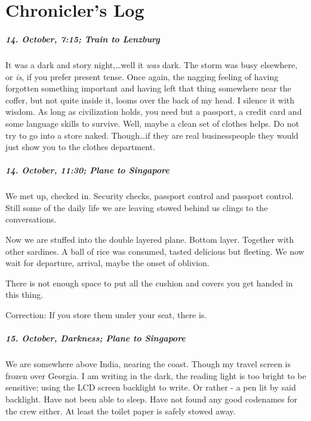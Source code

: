 \chapter{Chronicler's Log}

\paragraph{14. October, 7:15; Train to Lenzburg}
It was a dark and story night,\ldots well it \emph{was} dark.
The storm was busy elsewhere, or \emph{is}, if you prefer present tense.
Once again, the nagging feeling of having forgotten something important and having left that thing somewhere near the coffer, but not quite inside it, looms over the back of my head.
I silence it with wisdom.
As long as civilization holds, you need but a passport, a credit card and some language skills to survive.
Well, maybe a clean set of clothes helps.
Do not try to go into a store naked.
Though\ldots if they are real businesspeople they would just show you to the clothes department.

\paragraph{14. October, 11:30; Plane to Singapore}
We met up, checked in.
Security checks, passport control and passport control.
Still some of the daily life we are leaving stowed behind us clings to the conversations.

Now we are stuffed into the double layered plane.
Bottom layer.
Together with other sardines.
A ball of rice was consumed, tasted delicious but fleeting.
We now wait for departure, arrival, maybe the onset of oblivion.

There is not enough space to put all the cushion and covers you get handed in this thing.

Correction: If you store them under your seat, there is.

\paragraph{15. October, Darkness; Plane to Singapore}
We are somewhere above India, nearing the coast.
Though my travel screen is frozen over Georgia.
I am writing in the dark, the reading light is too bright to be sensitive; using the LCD screen backlight to write.
Or rather - a pen lit by said backlight.
Have not been able to sleep.
Have not found any good codenames for the crew either.
At least the toilet paper is safely stowed away.

